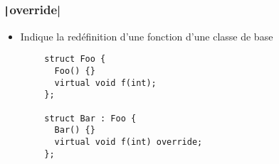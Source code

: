 \documentclass[C++.tex]{subfiles}
\begin{document}
\begin{frame}[fragile]
	\frametitle{\texttt|override|}
	\begin{itemize}
		\item Indique la redéfinition d'une fonction d'une classe de base
	\end{itemize}

	\begin{verbatim}
		struct Foo {
		  Foo() {}
		  virtual void f(int);
		};

		struct Bar : Foo {
		  Bar() {}
		  virtual void f(int) override;
		};
	\end{verbatim}

\end{frame}
\end{document}
